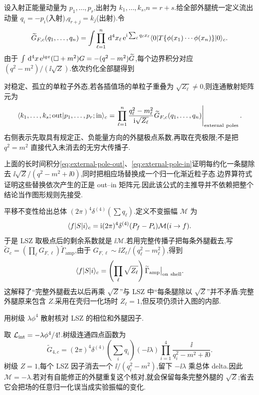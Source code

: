 设入射正能量动量为 $p_1,\ldots,p_r$,出射为 $k_1,\ldots,k_s$,$n=r+s$.给全部外腿统一定义流出动量
$q_i=-p_i$(入射),$q_{r+j}=k_j$(出射).令
\[
 \widetilde G_{F,c}(q_1,\ldots,q_n)=\int\prod_{\ell=1}^n\,\mathrm d^4x_\ell\,
 \mathrm e^{\mathrm i\sum_\ell q_\ell x_\ell}
 \langle 0\rvert T\{\phi(x_1)\cdots\phi(x_n)\}\lvert 0\rangle_c.
\]
由于 $\int\,\mathrm d^4x\,\mathrm e^{\mathrm i qx}(\Box+m^2)G=-(q^2-m^2)\widetilde G$,每个边界积分对应 $(q^2-m^2)/(\ii\sqrt Z)$.依次约化全部腿得到
\begin{proposition}[标量 LSZ 约化]\label{prop:LSZ}
对稳定、孤立的单粒子外态,若各插值场的单粒子重叠为 $\sqrt{Z_\ell}\ne0$,则连通散射矩阵元为
\begin{equation}\label{eq:LSZ-momentum}
 \bra{k_1,\ldots,k_s;\mathrm{out}}p_1,\ldots,p_r;\mathrm{in}\rangle_c
 =\left.\prod_{\ell=1}^n\frac{q_\ell^2-m_\ell^2}{\ii\sqrt{Z_\ell}}
 \widetilde G_{F,c}(q_1,\ldots,q_n)\right|_{\mathrm{external\ poles}}.
\end{equation}
右侧表示先取具有规定正、负能量方向的外腿极点系数,再取在壳极限;不是把 $q^2=m^2$ 直接代入未消去的无穷大传播子.
\end{proposition}

上面的长时间积分\eqref{eq:external-pole-out}、\eqref{eq:external-pole-in}证明每约化一条腿除去 $\ii\sqrt Z/(q^2-m^2+\ii0)$,同时把相应场替换成一个归一化渐近粒子态.边界算符式证明这些替换依次产生的正是 out--in 矩阵元.因此该公式的主推导并不依赖把整个结论当作图形规则先接受.

平移不变性给出总体 $(2\pi)^4\delta^{(4)}(\sum q_\ell)$.定义不变振幅 $\mathcal M$ 为
\[
 \langle f\rvert S\lvert i\rangle_c=\mathrm i(2\pi)^4\delta^{(4)}(P_f-P_i)\mathcal M(i\to f).
\]
于是 LSZ 取极点后的剩余系数就是 $\ii\mathcal M$.若用完整传播子把每条外腿截去,写 $\widetilde G_c=(\prod_\ell G_{F,\ell})\widetilde\Gamma_{\mathrm{amp}}$,由于 $G_{F,\ell}\sim\ii Z_\ell/(q_\ell^2-m_\ell^2)$,得到
\[
 \bra fS\ket i_c=\left(\prod_\ell\sqrt{Z_\ell}\right)\widetilde\Gamma_{\mathrm{amp}}\big|_{\mathrm{on\ shell}}.
\]
这解释了“完整外腿截去以后再乘 $\sqrt Z$”与 LSZ 中“每条腿除以 $\sqrt Z$”并不矛盾:完整外腿原来包含 $Z$.采用在壳归一化场时 $Z_\ell=1$,但反项仍须计入图的内部.

\begin{example}
用树级 $\lambda\phi^4$ 散射核对 LSZ 的相位和外腿因子.
\end{example}
\begin{solution}
取 $\mathcal L_{\mathrm{int}}=-\lambda\phi^4/4!$.树级连通四点函数为
\[
 \widetilde G_{4,c}=(2\pi)^4\delta^{(4)}\left(\sum_iq_i\right)
 (-\ii\lambda)\prod_{i=1}^4\frac{\ii}{q_i^2-m^2+\ii0}.
\]
树级 $Z=1$,每个 LSZ 因子消去一个 $\ii/(q_i^2-m^2)$,留下 $-\ii\lambda$ 乘总体 delta.因此 $\mathcal M=-\lambda$.若对有自能修正的外腿重复这个核对,就会保留每条完整外腿的 $\sqrt Z$;省去它会把场的任意归一化误当成实验振幅的变化.
\end{solution}

